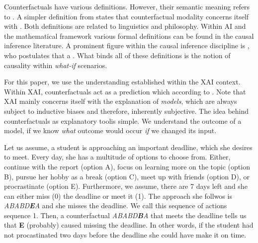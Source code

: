 \documentclass[./../../paper.tex]{subfiles}
\begin{document}
Counterfactuals have various definitions. However, their semantic meaning refers to \autocite{_counterfactual_}. A simpler definition from \citeauthor{starr_Counterfactuals_2021} states that counterfactual modality concerns itself with .
Both definitions are related to linguistics and philosophy. Within AI and the mathematical framework various formal definitions can be found in the causal inference\autocite{hitchcock_CausalModels_2020} literature. A prominent figure within the causal inference discipline is \citeauthor{pearl_Causalinferencestatistics_2016}, who postulates that a \autocite{pearl_Causalinferencestatistics_2016}. What binds all of these definitions is the notion of causality within \emph{what-if} scenarios.

For this paper, we use the understanding established within the \gls{XAI} context. Within \gls{XAI}, counterfactuals act as a prediction which  according to \citeauthor{molnar2019}\autocite[p. 212]{molnar2019}. Note that \gls{XAI} mainly concerns itself with the explanation of \emph{models}, which are always subject to inductive biases and therefore, inherently subjective. The idea behind counterfactuals as explanatory tool\footnotemark is simple. We understand the outcome of a model, if we know \emph{what} outcome would occur \emph{if} we changed its input. 

Let us assume, a student is approaching an important deadline, which she desires to meet. Every day, she has a multitude of options to choose from. Either, continue with the report (option A), focus on learning more on the topic (option B), pursue her hobby as a break (option C), meet up with friends (option D), or procrastinate (option E). Furthermore, we assume, there are 7 days left and she can either miss (0) the deadline or meet it (1). The approach she follwos is \textit{ABABD\textbf{E}A} and she misses the deadline. We call this sequence of actions sequence 1. 
Then, a counterfactual \textit{ABABD\textbf{B}A} that meets the deadline tells us that \textbf{E} (probably) caused missing the deadline. In other words, if the student had not procastinated two days before the deadline she could have make it on time.
\end{document}
